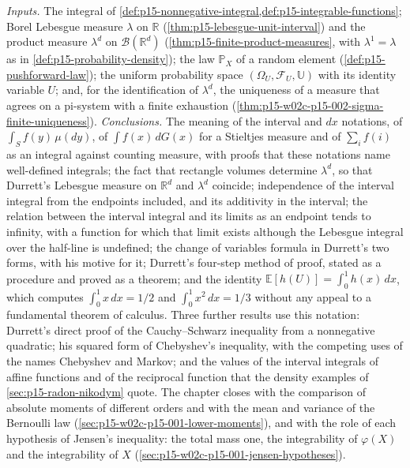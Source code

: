 \emph{Inputs.} The integral of
\cref{def:p15-nonnegative-integral,def:p15-integrable-functions}; Borel
Lebesgue measure \(\lambda\) on \(\mathbb R\)
(\cref{thm:p15-lebesgue-unit-interval}) and the product measure
\(\lambda^d\) on \(\mathcal B(\mathbb R^d)\)
(\cref{thm:p15-finite-product-measures}, with \(\lambda^1=\lambda\) as
in \cref{def:p15-probability-density}); the law \(\mathbb P_X\) of a
random element (\cref{def:p15-pushforward-law}); the uniform
probability space \((\Omega_U,\mathcal F_U,\mathbb U)\) with its identity
variable \(U\); and, for the identification of \(\lambda^d\), the
uniqueness of a measure that agrees on a pi-system with a finite exhaustion
(\cref{thm:p15-w02c-p15-002-sigma-finite-uniqueness}).
\emph{Conclusions.} The meaning of the interval and \(dx\) notations, of
\(\int_S f(y)\,\mu(dy)\), of \(\int f(x)\,dG(x)\) for a Stieltjes
measure and of \(\sum_if(i)\) as an integral against counting measure,
with proofs that these notations name well-defined integrals; the fact that rectangle volumes determine
\(\lambda^d\), so that Durrett's Lebesgue measure on \(\mathbb R^d\) and
\(\lambda^d\) coincide; independence of the interval integral from the
endpoints included, and its additivity in the interval; the relation
between the interval integral and its limits as an endpoint tends to
infinity, with a function for which that limit exists although the
Lebesgue integral over the half-line is undefined; the change of variables
formula in Durrett's two forms, with his motive for it; Durrett's
four-step method of proof, stated as a procedure and proved as a
theorem; and the identity
\(\mathbb E[h(U)]=\int_0^1h(x)\,dx\), which computes
\(\int_0^1x\,dx=1/2\) and \(\int_0^1x^2\,dx=1/3\) without any
appeal to a fundamental theorem of calculus. Three further results use
this notation: Durrett's direct proof of the Cauchy--Schwarz inequality
from a nonnegative quadratic; his squared form of Chebyshev's inequality,
with the competing uses of the names Chebyshev and Markov; and the values
of the interval integrals of affine functions and of the reciprocal
function that the density examples of \cref{sec:p15-radon-nikodym}
quote. The chapter closes with the comparison of absolute moments of
different orders and with the mean and variance of the Bernoulli law
(\cref{sec:p15-w02c-p15-001-lower-moments}), and with the role of each
hypothesis of Jensen's inequality: the total mass one, the integrability
of \(\varphi(X)\) and the integrability of \(X\)
(\cref{sec:p15-w02c-p15-001-jensen-hypotheses}).

